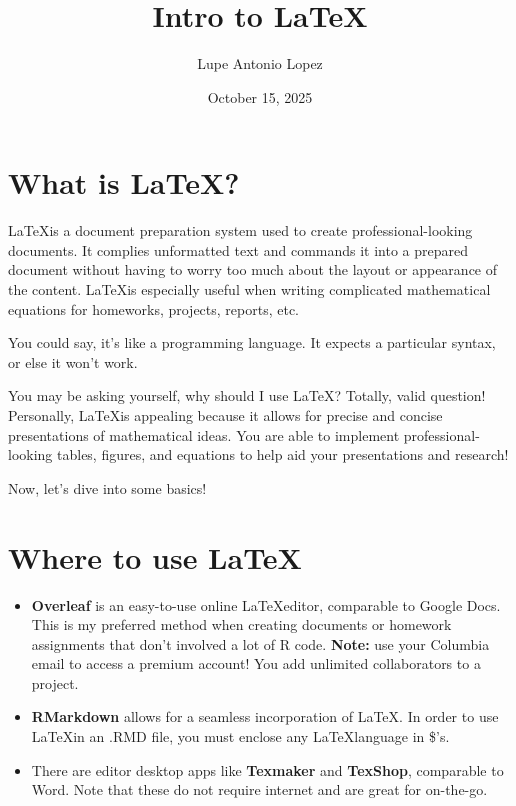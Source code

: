 \documentclass[11pt]{article}
\title{Intro to \LaTeX}
\author{Lupe Antonio Lopez}
\date{October 15, 2025}
\begin{document}
\maketitle

\section{What is \LaTeX?}

\LaTeX is a document preparation system used to create professional-looking documents. It complies unformatted text and commands it into a prepared document without having to worry too much about the layout or appearance of the content. \LaTeX is especially useful when writing complicated mathematical equations for homeworks, projects, reports, etc. 

\noindent You could say, it's like a programming language. It expects a particular syntax, or else it won't work. 

\noindent You may be asking yourself, why should I use \LaTeX? Totally, valid question! Personally, \LaTeX is appealing because it allows for precise and concise presentations of mathematical ideas. You are able to implement professional-looking tables, figures, and equations to help aid your presentations and research! 

Now, let's dive into some basics!

\section{Where to use \LaTeX}

\begin{itemize}
    \item \textbf{Overleaf} is an easy-to-use online \LaTeX editor, comparable to Google Docs. This is my preferred method when creating documents or homework assignments that don't involved a lot of R code. \textbf{Note:} use your Columbia email to access a premium account! You add unlimited collaborators to a project. 

    \item \textbf{RMarkdown} allows for a seamless incorporation of \LaTeX. In order to use \LaTeX in an .RMD file, you must enclose any \LaTeX language in \$'s.

    \item There are editor desktop apps like \textbf{Texmaker} and \textbf{TexShop}, comparable to Word. Note that these do not require internet and are great for on-the-go. 
\end{itemize}
\end{document}
